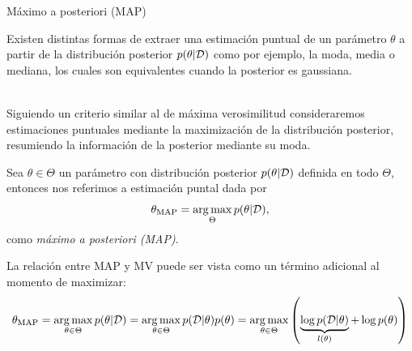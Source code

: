 \documentclass[9pt]{beamer}
\begin{document}
\begin{frame}{Máximo a posteriori (MAP)}

Existen distintas formas de extraer una estimación puntual de un parámetro $\theta$ a partir de la distribución posterior $p(\theta|{\mathcal D})$ como por ejemplo, la moda, media o mediana, los cuales son equivalentes cuando la posterior es gaussiana.\\~\ \pause

Siguiendo un criterio similar al de máxima verosimilitud consideraremos estimaciones puntuales mediante la maximización de la distribución posterior, resumiendo la información de la posterior mediante su moda. 

\begin{definition}
Sea $\theta\in\Theta$ un parámetro con distribución posterior $p(\theta|{\mathcal D})$ definida en todo $\Theta$, entonces nos referimos a estimación puntal dada por
\begin{equation*}
	\theta_\text{MAP} = \operatorname*{arg\,max}_{\Theta}p(\theta|{\mathcal D}),
\end{equation*}
como \emph{máximo a posteriori (MAP)}.

\end{definition}\pause

La relación entre MAP y MV puede ser vista como un término adicional al momento de maximizar:
\begin{equation*}
	\theta_\text{MAP} = \operatorname*{arg\,max}_{\theta\in\Theta}p(\theta|{\mathcal D}) = \operatorname*{arg\,max}_{\theta\in\Theta}p({\mathcal D}|\theta)p(\theta)= \operatorname*{arg\,max}_{\theta\in\Theta}\left(\underbrace{\log p({\mathcal D}|\theta)}_{l(\theta)} + \log p(\theta)\right)
\end{equation*}
	
\end{frame}
\end{document}
